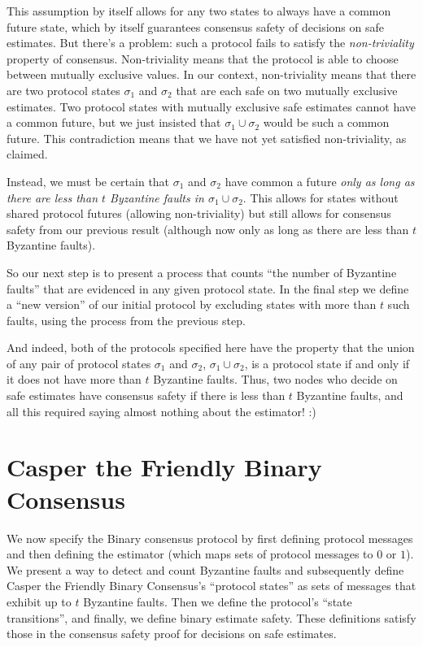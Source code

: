 \documentclass{article}
\theoremstyle{definition}
\begin{document}
This assumption by itself allows for any two states to always have a common future state, which by itself guarantees consensus safety of decisions on safe estimates. But there's a problem: such a protocol fails to satisfy the \emph{non-triviality} property of consensus. Non-triviality means that the protocol is able to choose between mutually exclusive values. In our context, non-triviality means that there are two protocol states $\sigma_1$ and $\sigma_2$ that are each safe on two mutually exclusive estimates. Two protocol states with mutually exclusive safe estimates cannot have a common future, but we just insisted that $\sigma_1 \cup \sigma_2$ would be such a common future. This contradiction means that we have not yet satisfied non-triviality, as claimed.

Instead, we must be certain that $\sigma_1$ and $\sigma_2$ have common a future \emph{only as long as there are less than $t$ Byzantine faults in $\sigma_1 \cup \sigma_2$}. This allows for states without shared protocol futures (allowing non-triviality) but still allows for consensus safety from our previous result (although now only as long as there are less than $t$ Byzantine faults).

So our next step is to present a process that counts ``the number of Byzantine faults'' that are evidenced in any given protocol state. In the final step we define a ``new version'' of our initial protocol by excluding states with more than $t$ such faults, using the process from the previous step.

And indeed, both of the protocols specified here have the property that the union of any pair of protocol states $\sigma_1$ and $\sigma_2$, $\sigma_1 \cup \sigma_2$, is a protocol state if and only if it does not have more than $t$ Byzantine faults. Thus, two nodes who decide on safe estimates have consensus safety if there is less than $t$ Byzantine faults, and all this required saying almost nothing about the estimator! :)



\section{Casper the Friendly Binary Consensus}

We now specify the Binary consensus protocol by first defining protocol messages and then defining the estimator (which maps sets of protocol messages to $0$ or $1$). We present a way to detect and count Byzantine faults and subsequently define Casper the Friendly Binary Consensus's ``protocol states'' as sets of messages that exhibit up to $t$ Byzantine faults. Then we define the protocol's ``state transitions'', and finally, we define binary estimate safety.  These definitions satisfy those in the consensus safety proof for decisions on safe estimates.
\end{document}
